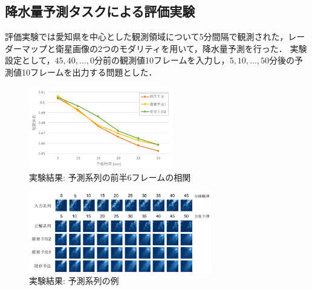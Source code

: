 \documentclass[a4j,twoside]{jarticle}
\begin{document}
\begin{論文概要}
\section{降水量予測タスクによる評価実験}
%
評価実験では愛知県を中心とした観測領域について5分間隔で観測された，レーダーマップと衛星画像の2つのモダリティを用いて，降水量予測を行った．
実験設定として，$45,40,...,0$分前の観測値10フレームを入力し，$5,10,...,50$分後の予測値10フレームを出力する問題とした．
\begin{figure}[h]
	\centering
	\includegraphics[width=6.3cm]{../images/5.Experiment/exp2_correlation_abst.pdf}
	\vspace{-0.2cm}
	\caption{実験結果: 予測系列の前半6フレームの相関}
	\label{fig:exp_correlation}
	\vspace{-0.1cm}
\end{figure}
\begin{figure}[h]
	\centering
	\includegraphics[width=8cm]{../images/5.Experiment/xxx-merged-473-c.pdf}
	\caption{実験結果: 予測系列の例}

\end{figure}
\end{論文概要}
\end{document}
